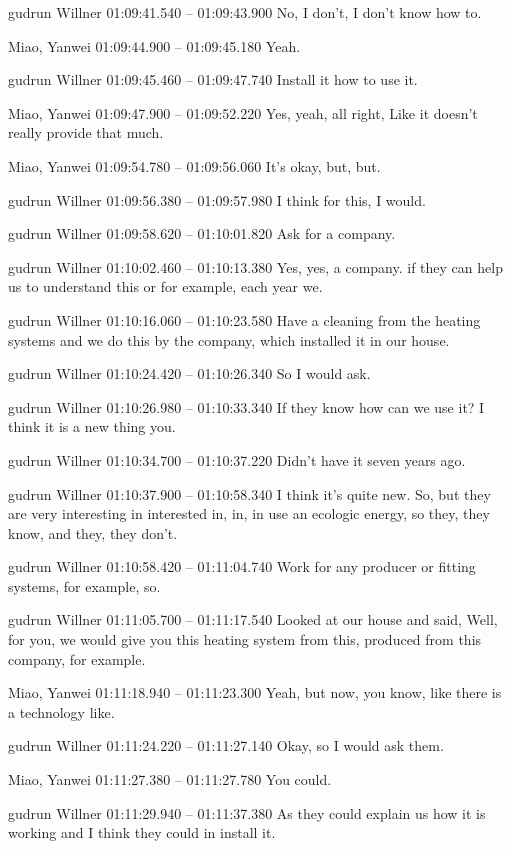 {gudrun Willner 01:09:41.540 -- 01:09:43.900
No, I don't, I don't know how to.

Miao, Yanwei 01:09:44.900 -- 01:09:45.180
Yeah.

gudrun Willner 01:09:45.460 -- 01:09:47.740
Install it how to use it.

Miao, Yanwei 01:09:47.900 -- 01:09:52.220
Yes, yeah, all right, Like it doesn't really provide that much.

Miao, Yanwei 01:09:54.780 -- 01:09:56.060
It's okay, but, but.

gudrun Willner 01:09:56.380 -- 01:09:57.980
I think for this, I would.

gudrun Willner 01:09:58.620 -- 01:10:01.820
Ask for a company.

gudrun Willner 01:10:02.460 -- 01:10:13.380
Yes, yes, a company. if they can help us to understand this or for example, each year we.

gudrun Willner 01:10:16.060 -- 01:10:23.580
Have a cleaning from the heating systems and we do this by the company, which installed it in our house.

gudrun Willner 01:10:24.420 -- 01:10:26.340
So I would ask.

gudrun Willner 01:10:26.980 -- 01:10:33.340
If they know how can we use it? I think it is a new thing you.

gudrun Willner 01:10:34.700 -- 01:10:37.220
Didn't have it seven years ago.

gudrun Willner 01:10:37.900 -- 01:10:58.340
I think it's quite new. So, but they are very interesting in interested in, in, in use an ecologic energy, so they, they know, and they, they don't.

gudrun Willner 01:10:58.420 -- 01:11:04.740
Work for any producer or fitting systems, for example, so.

gudrun Willner 01:11:05.700 -- 01:11:17.540
Looked at our house and said, Well, for you, we would give you this heating system from this, produced from this company, for example.

Miao, Yanwei 01:11:18.940 -- 01:11:23.300
Yeah, but now, you know, like there is a technology like.

gudrun Willner 01:11:24.220 -- 01:11:27.140
Okay, so I would ask them.

Miao, Yanwei 01:11:27.380 -- 01:11:27.780
You could.

gudrun Willner 01:11:29.940 -- 01:11:37.380
As they could explain us how it is working and I think they could in install it.

}
